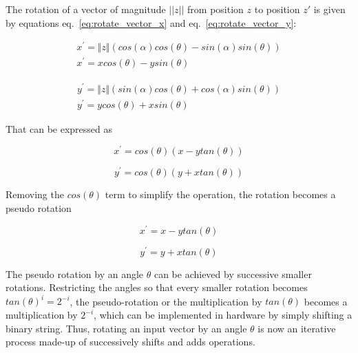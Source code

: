 
The rotation of a vector of magnitude $||z||$ from position $z$ to position $z'$ is given by equations eq.~\ref{eq:rotate_vector_x} and eq.~\ref{eq:rotate_vector_y}:

\begin{equation} 
\begin{gathered}
x^{'} = \Vert{z}\Vert (cos(\alpha)cos(\theta) - sin(\alpha)sin(\theta)) \\
x^{'} = xcos(\theta) - ysin(\theta)      
    \label{eq:rotate_vector_x}
\end{gathered}
\end{equation}

\begin{equation} 
\begin{gathered}
y^{'} = \Vert{z}\Vert (sin(\alpha)cos(\theta) + cos(\alpha)sin(\theta)) \\
y^{'} = ycos(\theta) + xsin(\theta)      
	\label{eq:rotate_vector_y}
\end{gathered}
\end{equation}

That can be expressed as

\begin{equation} 
x^{'} = cos(\theta)(x - ytan(\theta))
    \label{eq:rotate_vector_x2}
\end{equation}

\begin{equation} 
y^{'} = cos(\theta)(y + xtan(\theta))
	\label{eq:rotate_vector_y2}
\end{equation}

Removing the $cos(\theta)$ term to simplify the operation, the rotation becomes a pseudo rotation

\begin{equation} 
x^{'} = x - ytan(\theta)
    \label{eq:pseudo_rotate_x}
\end{equation}

\begin{equation} 
y^{'} = y + xtan(\theta)
	\label{eq:pseudo_rotate_y}
\end{equation}

The pseudo rotation by an angle $\theta$ can be achieved by successive smaller rotations. Restricting the angles so that every smaller rotation becomes $tan(\theta)^i = 2^{-i}$, the pseudo-rotation or the multiplication by $tan(\theta)$ becomes a multiplication by $2^{-i}$, which can be implemented in hardware by simply shifting a binary string. Thus, rotating an input vector by an angle $\theta$ is now an iterative process made-up of successively shifts and adds operations. 


